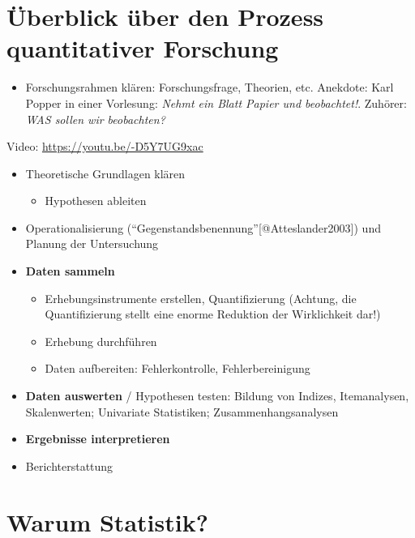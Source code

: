 \documentclass[
]{book}
\providecommand{\tightlist}{%
  \setlength{\itemsep}{0pt}\setlength{\parskip}{0pt}}
\begin{document}
\hypertarget{uxfcberblick-uxfcber-den-prozess-quantitativer-forschung}{%
\section{Überblick über den Prozess quantitativer Forschung}\label{uxfcberblick-uxfcber-den-prozess-quantitativer-forschung}}

\begin{itemize}
\tightlist
\item
  Forschungsrahmen klären: Forschungsfrage, Theorien, etc. Anekdote: Karl Popper in einer Vorlesung: \emph{Nehmt ein Blatt Papier und beobachtet!}. Zuhörer: \emph{WAS sollen wir beobachten?}
\end{itemize}

Video: \url{https://youtu.be/-D5Y7UG9xac}

\begin{itemize}
\tightlist
\item
  Theoretische Grundlagen klären

  \begin{itemize}
  \tightlist
  \item
    Hypothesen ableiten
  \end{itemize}
\item
  Operationalisierung (``Gegenstandsbenennung''{[}@Atteslander2003{]}) und Planung der Untersuchung
\item
  \textbf{Daten sammeln}

  \begin{itemize}
  \tightlist
  \item
    Erhebungsinstrumente erstellen, Quantifizierung (Achtung, die Quantifizierung stellt eine enorme Reduktion der Wirklichkeit dar!)
  \item
    Erhebung durchführen
  \item
    Daten aufbereiten: Fehlerkontrolle, Fehlerbereinigung
  \end{itemize}
\item
  \textbf{Daten auswerten} / Hypothesen testen: Bildung von Indizes, Itemanalysen, Skalenwerten; Univariate Statistiken; Zusammenhangsanalysen
\item
  \textbf{Ergebnisse interpretieren}
\item
  Berichterstattung
\end{itemize}

\hypertarget{warum-statistik}{%
\section{Warum Statistik?}\label{warum-statistik}}
\end{document}
